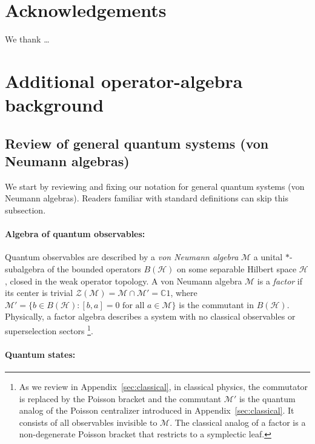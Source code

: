 \documentclass[a4paper,11pt]{article}
\theoremstyle{definition}
\newcommand{\mH}{\mathcal{H}}
\newcommand{\mM}{\mathcal{M}}
\begin{document}
\section*{Acknowledgements}
We thank \ldots

\appendix

\section{Additional operator-algebra background}\label{app:extra-operator-algebra}

\subsection{Review of general quantum systems (von Neumann algebras)}\label{app:vN}

We start by reviewing and fixing our notation for general quantum systems (von Neumann algebras). Readers familiar with standard definitions can skip this subsection.

\paragraph{Algebra of quantum observables:}
Quantum observables are described by a
\emph{von Neumann algebra} $\mM$ a unital $*$-subalgebra of the bounded operators
$B(\mathcal{H})$ on some separable Hilbert space $\mathcal{H}$, closed in the
weak operator topology.
A von Neumann algebra $\mM$ is a \emph{factor} if its center is trivial
$\mathcal{Z}(\mM) = \mM\cap\mM'=\mathbb{C} 1$, where $\mM' = \{b\in B(\mathcal{H}) : [b,a]=0\text{ for all }a\in\mM\}$
is the commutant in $B(\mH)$.  Physically, a factor algebra describes a system with no classical observables
 or superselection sectors \footnote{As we review in Appendix~\ref{sec:classical}, in classical physics, the commutator is replaced by the Poisson bracket and the commutant $\mM'$ is the quantum analog of the Poisson
centralizer introduced in Appendix~\ref{sec:classical}. It consists of all observables invisible to $\mM$. The classical analog of a factor is a non-degenerate Poisson bracket that restricts to a symplectic leaf.}.

\paragraph{Quantum states:}
\end{document}
